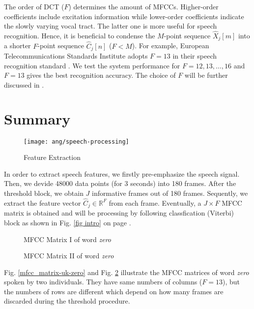 The order of DCT ($F$) determines the amount of MFCCs. Higher-order coefficients include excitation information while lower-order coefficients indicate the slowly varying vocal tract. The latter one is more useful for speech recognition.\cite{tan2008automatic} Hence, it is beneficial to condense the $M$-point sequence $\hat{X}_j[m]$ into a shorter $F$-point sequence $\hat{C}_j[n]$ ($F < M$). For example, European Telecommunications Standards Institute adopts $F = 13$ in their speech recognition standard \cite{etsi2001202}. We test the system performance for $F = 12, 13, \dots, 16$ and $F = 13$ gives the best recognition accuracy. The choice of $F$ will be further discussed in .


\section{Summary}

\begin{figure}[H]
\centering
\texttt{[image: ang/speech-processing]}
\caption{Feature Extraction}
\label{speech-processing}
\end{figure}

In order to extract speech features, we firstly pre-emphasize the speech signal. Then, we devide 48000 data points (for 3 seconds) into 180 frames. After the threshold block, we obtain $J$ informative frames out of 180 frames. Sequently, we extract the feature vector $\hat{C}_j \in \mathbb{R}^F$ from each frame. Eventually, a $J \times F$ MFCC matrix is obtained and will be processing by following classfication (Viterbi) block as shown in Fig. \ref{fig intro} on page \pageref{fig intro}.

\begin{figure}[H]
\begin{minipage}[t]{0.5\linewidth}
\centering
{}
\caption{MFCC Matrix I of word \textit{zero}}
\label{mfcc_matrix-uk-zero}
\end{minipage}
\begin{minipage}[t]{0.5\linewidth}
\centering
{}
\caption{MFCC Matrix II of word \textit{zero}}
\label{mfcc_matrix-us-zero}
\end{minipage}
\end{figure}

Fig. \ref{mfcc_matrix-uk-zero} and Fig. \ref{mfcc_matrix-us-zero} illustrate the MFCC matrices of word \textit{zero} spoken by two individuals. They have same numbers of columns ($F = 13$), but the numbers of rows are different which depend on how many frames are discarded during the threshold procedure.
